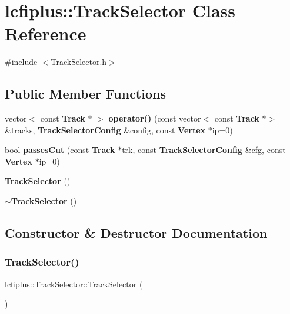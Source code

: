 \section{lcfiplus\+:\+:Track\+Selector Class Reference}
\label{classlcfiplus_1_1TrackSelector}


{\ttfamily \#include $<$Track\+Selector.\+h$>$}

\subsection*{Public Member Functions}
\begin{DoxyCompactItemize}
\item 
vector$<$ const \textbf{ Track} $\ast$ $>$ \textbf{ operator()} (const vector$<$ const \textbf{ Track} $\ast$$>$ \&tracks, \textbf{ Track\+Selector\+Config} \&config, const \textbf{ Vertex} $\ast$ip=0)
\item 
bool \textbf{ passes\+Cut} (const \textbf{ Track} $\ast$trk, const \textbf{ Track\+Selector\+Config} \&cfg, const \textbf{ Vertex} $\ast$ip=0)
\item 
\textbf{ Track\+Selector} ()
\item 
\textbf{ $\sim$\+Track\+Selector} ()
\end{DoxyCompactItemize}


\subsection{Constructor \& Destructor Documentation}
\mbox{\label{classlcfiplus_1_1TrackSelector_abbf95edea7689552204c9a8bf3654459}} 
\subsubsection{Track\+Selector()}
{\footnotesize\ttfamily lcfiplus\+::\+Track\+Selector\+::\+Track\+Selector (\begin{DoxyParamCaption}{ }\end{DoxyParamCaption})\hspace{0.3cm}{\ttfamily [inline]}}

\mbox{\label{classlcfiplus_1_1TrackSelector_a91dcf5c06016f3a26b2a163d49f89ea4}} 
